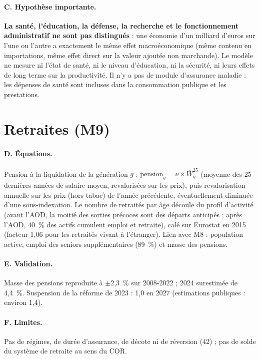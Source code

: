 \paragraph{C. Hypothèse importante.} \textbf{La santé, l'éducation, la défense, la recherche et le fonctionnement
administratif ne sont pas distingués} : une économie d'un milliard d'euros sur l'une ou l'autre a exactement le même
effet macroéconomique (même contenu en importations, même effet direct sur la valeur ajoutée non marchande). Le modèle
ne mesure ni l'état de santé, ni le niveau d'éducation, ni la sécurité, ni leurs effets de long terme sur la
productivité. Il n'y a pas de module d'assurance maladie : les dépenses de santé sont incluses dans la consommation
publique et les prestations.

\section{Retraites (M9)}

\paragraph{D. Équations.} Pension à la liquidation de la génération $g$ :
$\text{pension}_g = \nu \times \overline{W}^{25}_g$ (moyenne des 25 dernières années de salaire moyen, revalorisées sur
les prix), puis revalorisation annuelle sur les prix (hors tabac) de l'année précédente, éventuellement diminuée d'une
sous-indexation. Le nombre de retraités par âge découle du profil d'activité (avant l'AOD, la moitié des sorties
précoces sont des départs anticipés ; après l'AOD, 40~\% des actifs cumulent emploi et retraite), calé sur Eurostat en
2015 (facteur 1,06 pour les retraités vivant à l'étranger). Lien avec M8 : population active, emploi des seniors
supplémentaires (89~\%) et masse des pensions.

\paragraph{E. Validation.} Masse des pensions reproduite à $\pm$2,3~\% sur 2008-2022 ; 2024 surestimée de 4,4~\%.
Suspension de la réforme de 2023 : 1,0\md{} en 2027 (estimations publiques : environ 1,4\md).

\paragraph{F. Limites.} Pas de régimes, de durée d'assurance, de décote ni de réversion (42\md) ; pas de solde du système
de retraite au sens du COR.

